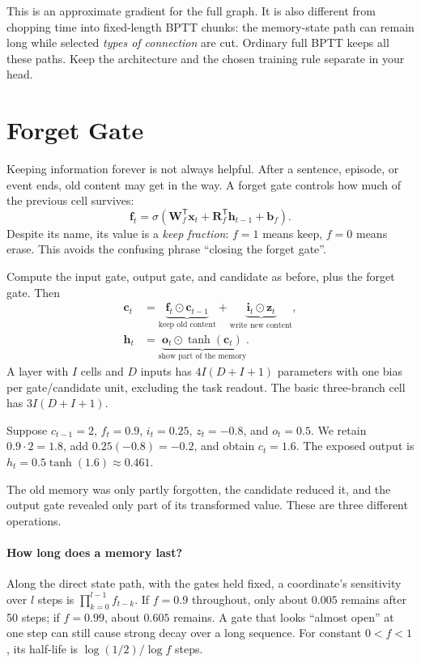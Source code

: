 \documentclass[11pt, oneside]{book}
\newcommand{\T}{^{\mathsf{T}}}           %
\let\originalsection\section
\renewcommand{\section}{\Needspace{7\baselineskip}\originalsection}
\begin{document}
This is an approximate gradient for the full graph. It is also different from chopping time into fixed-length BPTT chunks: the memory-state path can remain long while selected \emph{types of connection} are cut. Ordinary full BPTT keeps all these paths. Keep the architecture and the chosen training rule separate in your head.

\section{Forget Gate}\label{sec:source-3-2}
Keeping information forever is not always helpful. After a sentence, episode, or event ends, old content may get in the way. A forget gate controls how much of the previous cell survives:
\[
 \mathbf{f}_t=\sigma(\mathbf{W}_f\T\mathbf{x}_t+
                       \mathbf{R}_f\T\mathbf{h}_{t-1}+\mathbf{b}_f).
\]
Despite its name, its value is a \emph{keep fraction}: $f=1$ means keep, $f=0$ means erase. This avoids the confusing phrase ``closing the forget gate''.

\begin{thmbox}[title={Vanilla LSTM: keep, write, read}]
Compute the input gate, output gate, and candidate as before, plus the forget gate. Then
\begin{align}
 \mathbf{c}_t&=\underbrace{\mathbf{f}_t\odot\mathbf{c}_{t-1}}_{\text{keep old content}}
              +\underbrace{\mathbf{i}_t\odot\mathbf{z}_t}_{\text{write new content}},\label{eq:lstm-forget}\\
 \mathbf{h}_t&=\underbrace{\mathbf{o}_t\odot\tanh(\mathbf{c}_t)}_{\text{show part of the memory}}.
\end{align}
A layer with $I$ cells and $D$ inputs has $4I(D+I+1)$ parameters with one bias per gate/candidate unit, excluding the task readout. The basic three-branch cell has $3I(D+I+1)$.
\end{thmbox}

\begin{exbox}[title={One complete cell update}]
Suppose $c_{t-1}=2$, $f_t=0.9$, $i_t=0.25$, $z_t=-0.8$, and $o_t=0.5$. We retain $0.9\cdot2=1.8$, add $0.25(-0.8)=-0.2$, and obtain $c_t=1.6$. The exposed output is $h_t=0.5\tanh(1.6)\approx0.461$.

The old memory was only partly forgotten, the candidate reduced it, and the output gate revealed only part of its transformed value. These are three different operations.
\end{exbox}

\paragraph{How long does a memory last?} Along the direct state path, with the gates held fixed, a coordinate's sensitivity over $l$ steps is $\prod_{k=0}^{l-1}f_{t-k}$. If $f=0.9$ throughout, only about $0.005$ remains after 50 steps; if $f=0.99$, about $0.605$ remains. A gate that looks ``almost open'' at one step can still cause strong decay over a long sequence. For constant $0<f<1$, its half-life is $\log(1/2)/\log f$ steps.
\end{document}
